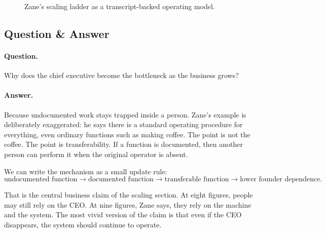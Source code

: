 \begin{figure}
\centering
{}
\caption{Zane's scaling ladder as a transcript-backed operating model.}
\end{figure}

\subsection{Question \& Answer}

\paragraph{Question.}
Why does the chief executive become the bottleneck as the business grows?

\paragraph{Answer.}
Because undocumented work stays trapped inside a person. Zane's example is deliberately exaggerated: he says there is a standard operating procedure for everything, even ordinary functions such as making coffee. The point is not the coffee. The point is transferability. If a function is documented, then another person can perform it when the original operator is absent.

We can write the mechanism as a small update rule:
\begin{equation}
\text{undocumented function}
\longrightarrow
\text{documented function}
\longrightarrow
\text{transferable function}
\longrightarrow
\text{lower founder dependence}.
\end{equation}

That is the central business claim of the scaling section. At eight figures, people may still rely on the CEO. At nine figures, Zane says, they rely on the machine and the system. The most vivid version of the claim is that even if the CEO disappears, the system should continue to operate.

